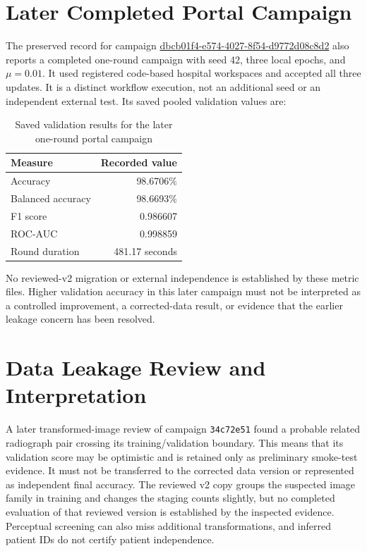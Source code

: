 \documentclass[12pt,a4paper]{report}
\begin{document}
\section{Later Completed Portal Campaign}
The preserved record for campaign \url{dbcb01f4-e574-4027-8f54-d9772d08c8d2}
also reports a completed one-round campaign with seed 42, three local epochs,
and $\mu=0.01$. It used registered code-based hospital workspaces and accepted
all three updates. It is a distinct workflow execution, not an additional seed
or an independent external test. Its saved pooled validation values are:
\begin{table}[htbp]
\centering
\caption{Saved validation results for the later one-round portal campaign}
\begin{tabular}{lr}
\toprule
\textbf{Measure} & \textbf{Recorded value} \\
\midrule
Accuracy & 98.6706\% \\
Balanced accuracy & 98.6693\% \\
F1 score & 0.986607 \\
ROC-AUC & 0.998859 \\
Round duration & 481.17 seconds \\
\bottomrule
\end{tabular}
\end{table}
No reviewed-v2 migration or external independence is established by these
metric files. Higher validation accuracy in this later campaign must not be
interpreted as a controlled improvement, a corrected-data result, or evidence
that the earlier leakage concern has been resolved.

\section{Data Leakage Review and Interpretation}
A later transformed-image review of campaign \texttt{34c72e51} found a probable related radiograph pair crossing its training/validation boundary. This means that its validation score may be optimistic and is retained only as preliminary smoke-test evidence. It must not be transferred to the corrected data version or represented as independent final accuracy. The reviewed v2 copy groups the suspected image family in training and changes the staging counts slightly, but no completed evaluation of that reviewed version is established by the inspected evidence. Perceptual screening can also miss additional transformations, and inferred patient IDs do not certify patient independence.
\end{document}
